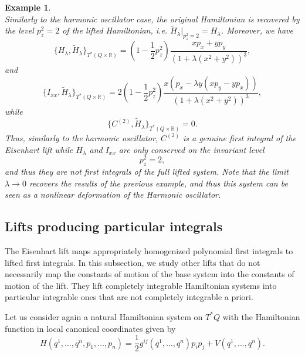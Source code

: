 \documentclass[10pt,a4paper]{article}
\newtheorem{example}{Example}
\begin{document}
\begin{example}
\begin{equation*}
\end{equation*}
Similarly to the harmonic oscillator case, the original Hamiltonian is recovered by the level $p_z^2=2$ of the lifted Hamiltonian, i.e. $\widetilde{H}_\lambda|_{p_z^2=2} = H_\lambda$. Moreover, we have
\begin{equation*}
    \{H_\lambda,\widetilde H_\lambda\}_{T^*(Q\times\mathbb R)} = \left(1-\frac12p_z^2\right) \frac{xp_x+yp_y}{(1+ \lambda (x^2 + y^2))^3},
\end{equation*}
and
\begin{equation*}
    \{I_{xx},\widetilde H_\lambda\}_{T^*(Q\times\mathbb R)} = 2 \left(1-\frac12p_z^2\right) \frac{x (p_x - \lambda y (x p_y - y p_x))}{(1+ \lambda (x^2 + y^2))^3},
\end{equation*}
while 
\begin{equation*}
    \{C^{(2)},\widetilde H_\lambda\}_{T^*(Q\times\mathbb R)} = 0 .
\end{equation*}
Thus, similarly to the harmonic oscillator, \(C^{(2)}\) is a genuine first integral of the Eisenhart lift while \(H_\lambda\) and \(I_{xx}\) are only conserved on the invariant level
\[
p_z^2=2,
\]
and thus they are not first integrals of the full lifted system. Note that the limit $\lambda \to 0$ recovers the results of the previous example, and thus this system can be seen as a nonlinear deformation of the Harmonic oscillator.
\end{example}



\subsection{Lifts producing particular integrals}
\label{secother}
The Eisenhart lift maps appropriately homogenized polynomial first integrals to lifted first integrals. In this subsection, we study other lifts that do not necessarily map the constants of motion of the base system into the constants of motion of the lift. They lift completely integrable Hamiltonian systems into particular integrable ones that are not completely integrable a priori. 

Let us consider again a natural Hamiltonian system on $T^{*}Q$ with the Hamiltonian function in local canonical coordinates given by
\begin{equation*}
H(q^{1},\ldots,q^{n},p_{1},\ldots, p_{n})=\frac{1}{2}g^{ij}(q^{1},\ldots,q^{n})p_{i}p_{j}+V(q^{1},\ldots,q^{n}).
\end{equation*}
\end{document}
